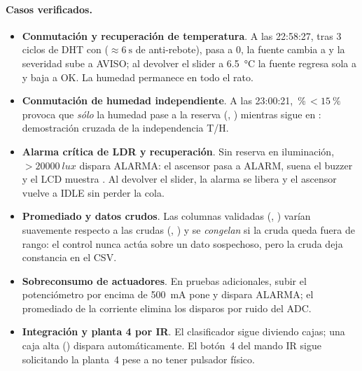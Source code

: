 \paragraph{Casos verificados.}

\begin{itemize}
  \item \textbf{Conmutación y recuperación de temperatura}. A las 22:58:27,
        tras 3 ciclos de DHT con  ($\approx\SI{6}{\second}$
        de anti-rebote),  pasa a 0, la fuente cambia a
         y la severidad sube a \textsf{AVISO}; al devolver el
        slider a \SI{6,5}{\celsius} la fuente regresa sola a  y
        baja a \textsf{OK}. La humedad permanece en  todo el rato.
  \item \textbf{Conmutación de humedad independiente}. A las 23:00:21,
        \,\%\,$<\SI{15}{\percent}$ provoca que \emph{sólo}
        la humedad pase a la reserva (,
        ) mientras  sigue en
        : demostración cruzada de la independencia T/H.
  \item \textbf{Alarma crítica de LDR y recuperación}. Sin reserva en
        iluminación, \,$>\SI{20000}{lux}$ dispara
        \textsf{ALARMA}: el ascensor pasa a \textsf{ALARM}, suena el buzzer
        y el LCD muestra . Al devolver el slider,
        la alarma se libera y el ascensor vuelve a \textsf{IDLE} sin perder
        la cola.
  \item \textbf{Promediado y datos crudos}. Las columnas validadas
        (, ) varían suavemente respecto a las
        crudas (, ) y se \emph{congelan} si
        la cruda queda fuera de rango: el control nunca actúa sobre un dato
        sospechoso, pero la cruda deja constancia en el CSV.
  \item \textbf{Sobreconsumo de actuadores}. En pruebas adicionales, subir el
        potenciómetro por encima de \SI{500}{\milli\ampere} pone
         y dispara \textsf{ALARMA}; el promediado de la
        corriente elimina los disparos por ruido del ADC.
  \item \textbf{Integración y planta 4 por IR}. El clasificador sigue
        diviendo cajas; una caja alta ()
        dispara  automáticamente. El botón~4
        del mando IR sigue solicitando la planta~4 pese a no tener pulsador
        físico.
\end{itemize}
